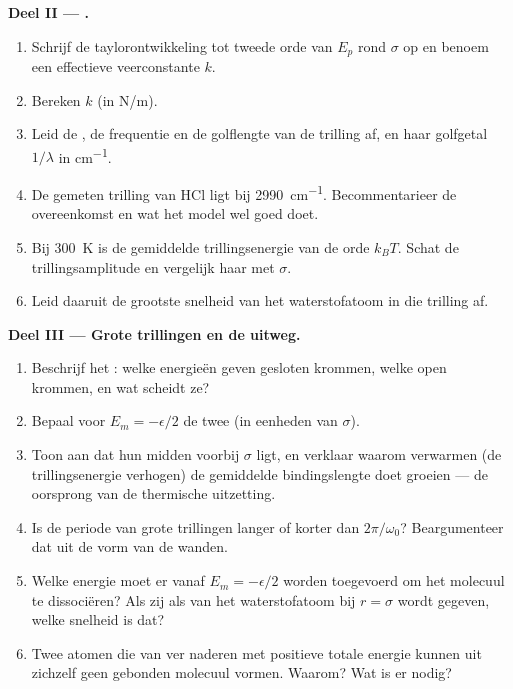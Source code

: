 \begin{problem}
\medskip
\noindent\textbf{Deel II --- .}
\begin{enumerate}[resume]
  \item Schrijf de taylorontwikkeling tot tweede orde van $E_p$ rond $\sigma$
        op en benoem een effectieve veerconstante $k$.
  \item Bereken $k$ (in \unit{N/m}).
  \item Leid de , de frequentie en de golflengte
        van de trilling af, en haar golfgetal $1/\lambda$ in \unit{cm^{-1}}.
  \item De gemeten trilling van HCl ligt bij \qty{2990}{cm^{-1}}. Becommentarieer
        de overeenkomst en wat het model wel goed doet.
  \item Bij \qty{300}{K} is de gemiddelde trillingsenergie van de orde $k_BT$.
        Schat de trillingsamplitude en vergelijk haar met $\sigma$.
  \item Leid daaruit de grootste snelheid van het waterstofatoom in die
        trilling af.
\end{enumerate}

\medskip
\noindent\textbf{Deel III --- Grote trillingen en de uitweg.}
\begin{enumerate}[resume]
  \item Beschrijf het : welke energieën geven gesloten krommen,
        welke open krommen, en wat scheidt ze?
  \item Bepaal voor $E_m = -\epsilon/2$ de twee  (in eenheden
        van $\sigma$).
  \item Toon aan dat hun midden voorbij $\sigma$ ligt, en verklaar waarom
        verwarmen (de trillingsenergie verhogen) de gemiddelde
        bindingslengte doet groeien --- de oorsprong van de thermische uitzetting.
  \item Is de periode van grote trillingen langer of korter dan
        $2\pi/\omega_0$? Beargumenteer dat uit de vorm van de wanden.
  \item Welke energie moet er vanaf $E_m = -\epsilon/2$ worden toegevoerd om
        het molecuul te dissociëren? Als zij als  van het
        waterstofatoom bij $r = \sigma$ wordt gegeven, welke snelheid is dat?
  \item Twee atomen die van ver naderen met positieve totale energie
        kunnen uit zichzelf geen gebonden molecuul vormen. Waarom? Wat is er nodig?
\end{enumerate}


\end{problem}
